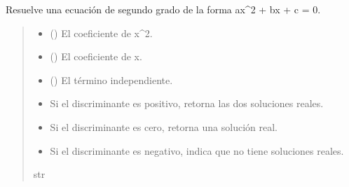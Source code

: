 \documentclass[letterpaper,10pt,spanish]{sphinxmanual}
\begin{document}
\begin{fulllineitems}
\label{\detokenize{pr3:pr3.1_4.resolver_ecuacion_segundo_grado}}
\pysigstartsignatures
{}
\pysigstopsignatures
\sphinxAtStartPar
Resuelve una ecuación de segundo grado de la forma ax\textasciicircum{}2 + bx + c = 0.
\begin{quote}\begin{description}
\begin{itemize}
\item {} 
\sphinxAtStartPar
{} () \textendash{} El coeficiente de x\textasciicircum{}2.

\item {} 
\sphinxAtStartPar
{} () \textendash{} El coeficiente de x.

\item {} 
\sphinxAtStartPar
{} () \textendash{} El término independiente.

\end{itemize}

\sphinxAtStartPar
\begin{description}
\begin{itemize}
\item {} 
\sphinxAtStartPar
Si el discriminante es positivo, retorna las dos soluciones reales.

\item {} 
\sphinxAtStartPar
Si el discriminante es cero, retorna una solución real.

\item {} 
\sphinxAtStartPar
Si el discriminante es negativo, indica que no tiene soluciones reales.

\end{itemize}

\end{description}


\sphinxAtStartPar
str

\end{description}\end{quote}

\end{fulllineitems}
\end{document}
